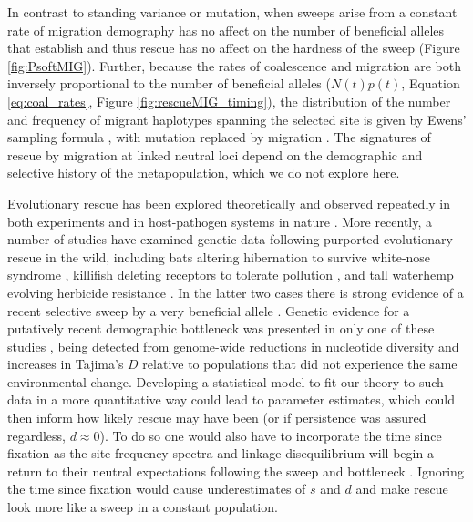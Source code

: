 \documentclass[]{article}
\begin{document}
In contrast to standing variance or mutation, when sweeps arise from a constant rate of migration demography has no affect on the number of beneficial alleles that establish \citep[as briefly noted by][]{pennings2006soft2} and thus rescue has no affect on the hardness of the sweep (Figure \ref{fig:PsoftMIG}). 
Further, because the rates of coalescence and migration are both inversely proportional to the number of beneficial alleles ($N(t) p(t)$, Equation \ref{eq:coal_rates}, Figure \ref{fig:rescueMIG_timing}), the distribution of the number and frequency of migrant haplotypes spanning the selected site is given by Ewens' sampling formula \citep{ewens1972sampling}, with mutation replaced by migration \citep{pennings2006soft2}.
The signatures of rescue by migration at linked neutral loci depend on the demographic and selective history of the metapopulation, which we do not explore here.

Evolutionary rescue has been explored theoretically \citep[e.g.,][]{gomulkiewicz1995does,uecker2016role,anciaux2018evolutionary} and observed repeatedly in both experiments \citep[e.g.,][]{bell2009evolutionary,lindsey2013evolutionary,ramsayer2013evolutionary} and in host-pathogen systems in nature \citep[e.,g.,][]{wei1995viral,feder2016more}.
More recently, a number of studies have examined genetic data following purported evolutionary rescue in the wild, including bats altering hibernation to survive white-nose syndrome \citep{gignoux2018genomic}, killifish deleting receptors to tolerate pollution \citep{oziolor2019adaptive}, and tall waterhemp evolving herbicide resistance \citep{kreiner2019multiple}.
In the latter two cases there is strong evidence of a recent selective sweep by a very beneficial allele \citep[in one of these cases the evidence includes reduced nucleotide diversity at the selected site;][]{kreiner2019multiple}.
Genetic evidence for a putatively recent demographic bottleneck was presented in only one of these studies \citep{oziolor2019adaptive}, being detected from genome-wide reductions in nucleotide diversity and increases in Tajima's $D$ relative to populations that did not experience the same environmental change.
Developing a statistical model to fit our theory to such data in a more quantitative way could lead to parameter estimates, which could then inform how likely rescue may have been (or if persistence was assured regardless, $d\approx0$).
To do so one would also have to incorporate the time since fixation as the site frequency spectra and linkage disequilibrium will begin a return to their neutral expectations following the sweep and bottleneck \citep[e.g., the sweep signatures in Tajima's $D$ and linkage disequilibrium decay within $\sim2N_e$ generations;][]{przeworski2002signature}.
Ignoring the time since fixation would cause underestimates of $s$ and $d$ and make rescue look more like a sweep in a constant population.
\end{document}
